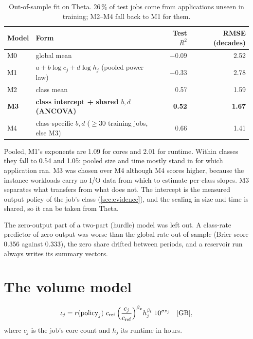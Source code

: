 \documentclass[11pt,a4paper]{article}
\newcommand{\ioVol}{\iota_j}
\begin{document}
\begin{table}[ht]
\centering\small
\caption{Out-of-sample fit on Theta. 26\,\% of test jobs come from applications
unseen in training; M2--M4 fall back to M1 for them.}\label{tab:models}
\begin{tabularx}{\linewidth}{lXrr}
\toprule
Model & Form & Test $R^2$ & RMSE (decades) \\
\midrule
M0 & global mean & $-0.09$ & 2.52 \\
M1 & $a + b\log c_j + d\log h_j$ (pooled power law) & $-0.33$ & 2.78 \\
M2 & class mean & 0.57 & 1.59 \\
\textbf{M3} & \textbf{class intercept + shared $b, d$ (ANCOVA)} & \textbf{0.52} & \textbf{1.67} \\
M4 & class-specific $b, d$ ($\geq 30$ training jobs, else M3) & 0.66 & 1.41 \\
\bottomrule
\end{tabularx}
\end{table}

Pooled, M1's exponents are 1.09 for cores and 2.01 for runtime. Within classes they
fall to 0.54 and 1.05: pooled size and time mostly stand in for which application
ran. M3 was chosen over M4 although M4 scores higher, because the instance
workloads carry no I/O data from which to estimate per-class slopes. M3 separates
what transfers from what does not. The intercept is the measured output policy of
the job's class (\cref{sec:evidence}), and the scaling in size and time is shared,
so it can be taken from Theta.

The zero-output part of a two-part (hurdle) model \citep{cragg1971some} was left out.
A class-rate predictor of zero output was worse than the global rate out of sample
(Brier score 0.356 against 0.333), the zero share drifted between periods, and a
reservoir run always writes its summary vectors.

\section{The volume model}\label{sec:volume}
\begin{equation}
  \ioVol = r(\text{policy}_j)\; c_{\mathrm{ref}}\,
  \Bigl(\frac{c_j}{c_{\mathrm{ref}}}\Bigr)^{\beta_p} h_j^{\beta_t}\; 10^{\sigma z_j}
  \quad\text{[GB]},
  \label{eq:volume}
\end{equation}
where $c_j$ is the job's core count and $h_j$ its runtime in hours.
\end{document}
